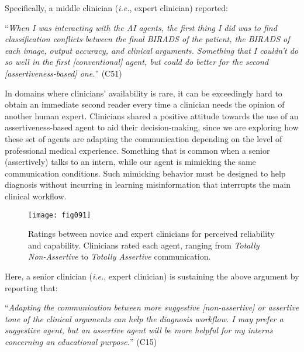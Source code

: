 \vspace{2.5mm}

\noindent
Specifically, a middle clinician ({\it i.e.}, expert clinician) reported:

\vspace{2.5mm}

\noindent
``{\it When I was interacting with the AI agents, the first thing I did was to find classification conflicts between the final BIRADS of the patient, the BIRADS of each image, output accuracy, and clinical arguments. Something that I couldn't do so well in the first [conventional] agent, but could do better for the second [assertiveness-based] one.}'' (C51)

\vspace{2.5mm}

In domains where clinicians' availability is rare, it can be exceedingly hard to obtain an immediate second reader every time a clinician needs the opinion of another human expert.
Clinicians shared a positive attitude towards the use of an assertiveness-based agent to aid their decision-making, since we are exploring how these set of agents are adapting the communication depending on the level of professional medical experience.
Something that is common when a senior (assertively) talks to an intern, while our agent is mimicking the same communication conditions.
Such mimicking behavior must be designed to help diagnosis without incurring in learning misinformation that interrupts the main clinical workflow.

\begin{figure*}[bp]
\centering
\texttt{[image: fig091]}
\caption[]{Ratings between novice and expert clinicians for perceived reliability and capability. Clinicians rated each agent, ranging from {\it Totally Non-Assertive} to {\it Totally Assertive} communication.}
\label{fig:fig091}
\end{figure*}

\noindent
Here, a senior clinician ({\it i.e.}, expert clinician) is sustaining the above argument by reporting that:

\vspace{2.5mm}

\noindent
``{\it Adapting the communication between more suggestive [non-assertive] or assertive tone of the clinical arguments can help the diagnosis workflow. I may prefer a suggestive agent, but an assertive agent will be more helpful for my interns concerning an educational purpose.}'' (C15)

